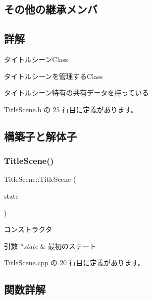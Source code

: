 \subsection*{その他の継承メンバ}


\subsection{詳解}
タイトルシーン\+Class 

タイトルシーンを管理する\+Class

タイトルシーン特有の共有データを持っている 

 Title\+Scene.\+h の 25 行目に定義があります。



\subsection{構築子と解体子}
\mbox{\label{class_title_scene_a433ef854689b1c9defb29d9f999c52da}} 
\subsubsection{\texorpdfstring{Title\+Scene()}{TitleScene()}}
{\footnotesize\ttfamily Title\+Scene\+::\+Title\+Scene (\begin{DoxyParamCaption}\item[{\mbox{\hyperlink{class_scene_base_1_1_state_base}{State\+Base}} $\ast$}]{state }\end{DoxyParamCaption})}



コンストラクタ 


\begin{DoxyParams}{引数}
{\em $\ast$state} & 最初のステート \\
\hline
\end{DoxyParams}


 Title\+Scene.\+cpp の 20 行目に定義があります。



\subsection{関数詳解}
\mbox{\label{class_title_scene_a28897f29ffe8725445bc0a27d7a865d1}} 
